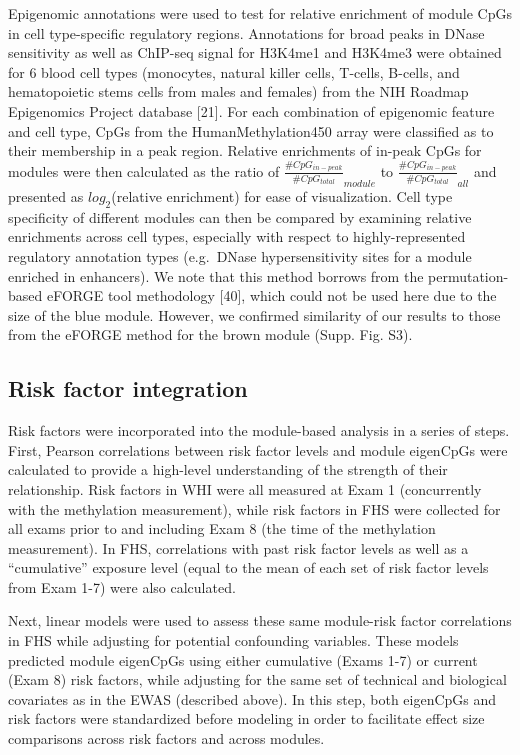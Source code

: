\documentclass[]{bmcart}
\theoremstyle{definition}
\theoremstyle{definition}
\theoremstyle{definition}
\theoremstyle{remark}
\begin{document}
Epigenomic annotations were used to test for relative enrichment of
module CpGs in cell type-specific regulatory regions. Annotations for
broad peaks in DNase sensitivity as well as ChIP-seq signal for H3K4me1
and H3K4me3 were obtained for 6 blood cell types (monocytes, natural
killer cells, T-cells, B-cells, and hematopoietic stems cells from males
and females) from the NIH Roadmap Epigenomics Project database {[}21{]}.
For each combination of epigenomic feature and cell type, CpGs from the
HumanMethylation450 array were classified as to their membership in a
peak region. Relative enrichments of in-peak CpGs for modules were then
calculated as the ratio of
\(\frac{\#CpG_{in-peak}}{\#CpG_{total}}_{module}\) to
\(\frac{\#CpG_{in-peak}}{\#CpG_{total}}_{all}\) and presented as
\(log_2\)(relative enrichment) for ease of visualization. Cell type
specificity of different modules can then be compared by examining
relative enrichments across cell types, especially with respect to
highly-represented regulatory annotation types (e.g.~DNase
hypersensitivity sites for a module enriched in enhancers). We note that
this method borrows from the permutation-based eFORGE tool methodology
{[}40{]}, which could not be used here due to the size of the blue
module. However, we confirmed similarity of our results to those from
the eFORGE method for the brown module (Supp. Fig. S3).

\subsection{Risk factor integration}\label{risk-factor-integration}

Risk factors were incorporated into the module-based analysis in a
series of steps. First, Pearson correlations between risk factor levels
and module eigenCpGs were calculated to provide a high-level
understanding of the strength of their relationship. Risk factors in WHI
were all measured at Exam 1 (concurrently with the methylation
measurement), while risk factors in FHS were collected for all exams
prior to and including Exam 8 (the time of the methylation measurement).
In FHS, correlations with past risk factor levels as well as a
``cumulative'' exposure level (equal to the mean of each set of risk
factor levels from Exam 1-7) were also calculated.

Next, linear models were used to assess these same module-risk factor
correlations in FHS while adjusting for potential confounding variables.
These models predicted module eigenCpGs using either cumulative (Exams
1-7) or current (Exam 8) risk factors, while adjusting for the same set
of technical and biological covariates as in the EWAS (described above).
In this step, both eigenCpGs and risk factors were standardized before
modeling in order to facilitate effect size comparisons across risk
factors and across modules.
\end{document}
